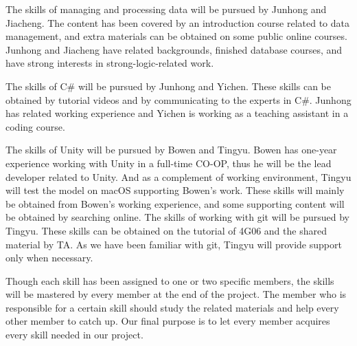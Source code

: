 \documentclass{article}
\begin{document}
The skills of managing and processing data will be pursued by Junhong and Jiacheng. The content has been covered by an introduction course related to data management, and extra materials can be obtained on some public online courses. Junhong and Jiacheng have related backgrounds, finished database courses, and have strong interests in strong-logic-related work. 

The skills of C\# will be pursued by Junhong and Yichen. These skills can be obtained by tutorial videos and by communicating to the experts in C\#. Junhong has related working experience and Yichen is working as a teaching assistant in a coding course. 

The skills of Unity will be pursued by Bowen and Tingyu. Bowen has one-year experience working with Unity in a full-time CO-OP, thus he will be the lead developer related to Unity. And as a complement of working environment, Tingyu will test the model on macOS supporting Bowen's work. These skills will mainly be obtained from Bowen's working experience, and some supporting content will be obtained by searching online. 
The skills of working with git will be pursued by Tingyu. These skills can be obtained on the tutorial of 4G06 and the shared material by TA. As we have been familiar with git, Tingyu will provide support only when necessary. 

Though each skill has been assigned to one or two specific members, the skills will be mastered by every member at the end of the project. The member who is responsible for a certain skill should study the related materials and help every other member to catch up. Our final purpose is to let every member acquires every skill needed in our project. 


\end{document}
